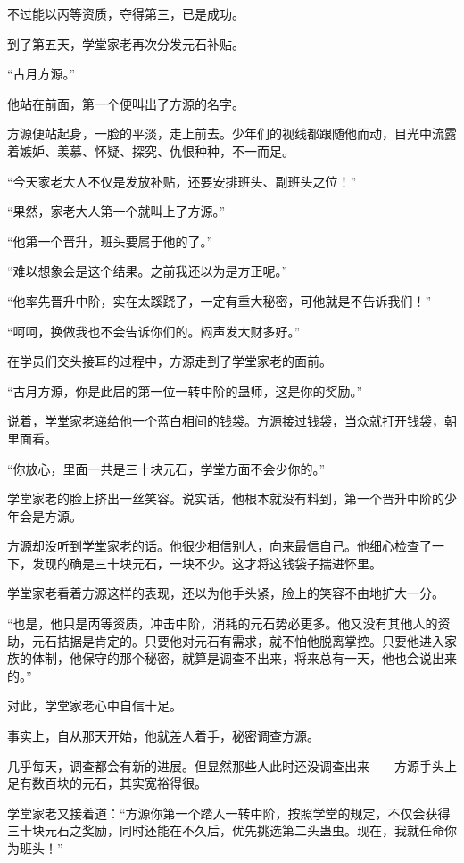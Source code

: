 \begin{this_body}
不过能以丙等资质，夺得第三，已是成功。

到了第五天，学堂家老再次分发元石补贴。

“古月方源。”

他站在前面，第一个便叫出了方源的名字。

方源便站起身，一脸的平淡，走上前去。少年们的视线都跟随他而动，目光中流露着嫉妒、羡慕、怀疑、探究、仇恨种种，不一而足。

“今天家老大人不仅是发放补贴，还要安排班头、副班头之位！”

“果然，家老大人第一个就叫上了方源。”

“他第一个晋升，班头要属于他的了。”

“难以想象会是这个结果。之前我还以为是方正呢。”

“他率先晋升中阶，实在太蹊跷了，一定有重大秘密，可他就是不告诉我们！”

“呵呵，换做我也不会告诉你们的。闷声发大财多好。”

在学员们交头接耳的过程中，方源走到了学堂家老的面前。

“古月方源，你是此届的第一位一转中阶的蛊师，这是你的奖励。”

说着，学堂家老递给他一个蓝白相间的钱袋。方源接过钱袋，当众就打开钱袋，朝里面看。

“你放心，里面一共是三十块元石，学堂方面不会少你的。”

学堂家老的脸上挤出一丝笑容。说实话，他根本就没有料到，第一个晋升中阶的少年会是方源。

方源却没听到学堂家老的话。他很少相信别人，向来最信自己。他细心检查了一下，发现的确是三十块元石，一块不少。这才将这钱袋子揣进怀里。

学堂家老看着方源这样的表现，还以为他手头紧，脸上的笑容不由地扩大一分。

“也是，他只是丙等资质，冲击中阶，消耗的元石势必更多。他又没有其他人的资助，元石拮据是肯定的。只要他对元石有需求，就不怕他脱离掌控。只要他进入家族的体制，他保守的那个秘密，就算是调查不出来，将来总有一天，他也会说出来的。”

对此，学堂家老心中自信十足。

事实上，自从那天开始，他就差人着手，秘密调查方源。

几乎每天，调查都会有新的进展。但显然那些人此时还没调查出来——方源手头上足有数百块的元石，其实宽裕得很。

学堂家老又接着道：“方源你第一个踏入一转中阶，按照学堂的规定，不仅会获得三十块元石之奖励，同时还能在不久后，优先挑选第二头蛊虫。现在，我就任命你为班头！”


\end{this_body}
